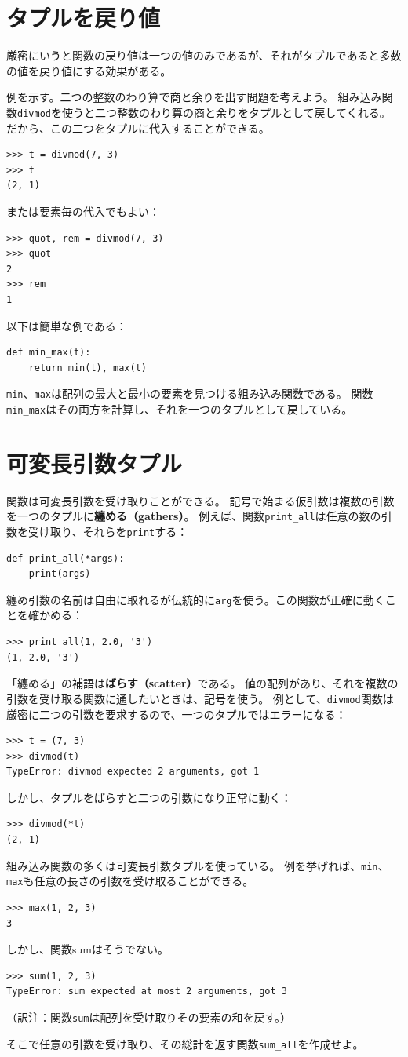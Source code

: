 \documentclass[a4j,12pt,makeidx]{jbook}
\begin{document}
\section{タプルを戻り値}
厳密にいうと関数の戻り値は一つの値のみであるが、それがタプルであると多数の値を戻り値にする効果がある。\par
例を示す。二つの整数のわり算で商と余りを出す問題を考えよう。
組み込み関数{\tt divmod}を使うと二つ整数のわり算の商と余りをタプルとして戻してくれる。　
だから、この二つをタプルに代入することができる。
\begin{verbatim}
>>> t = divmod(7, 3)
>>> t
(2, 1)
\end{verbatim}
または要素毎の代入でもよい：
\begin{verbatim}
>>> quot, rem = divmod(7, 3)
>>> quot
2
>>> rem
1
\end{verbatim} \par
以下は簡単な例である：
\begin{verbatim}
def min_max(t):
    return min(t), max(t)
\end{verbatim}
{\tt min}、{\tt max}は配列の最大と最小の要素を見つける組み込み関数である。
関数{\tt min\_max}はその両方を計算し、それを一つのタプルとして戻している。
%
\section{可変長引数タプル}
関数は可変長引数を受け取りことができる。
記号{\tt *}で始まる仮引数は複数の引数を一つのタプルに{\bf 纏める（gathers）}。
例えば、関数{\tt print\_all}は任意の数の引数を受け取り、それらを{\tt print}する：
\begin{verbatim}
def print_all(*args):
    print(args)
\end{verbatim}
纏め引数の名前は自由に取れるが伝統的に{\tt arg}を使う。この関数が正確に動くことを確かめる：
\begin{verbatim}
>>> print_all(1, 2.0, '3')
(1, 2.0, '3')
\end{verbatim} \par
「纏める」の補語は{\bf ばらす（scatter）}である。
値の配列があり、それを複数の引数を受け取る関数に通したいときは、記号{\tt *}を使う。
例として、{\tt divmod}関数は厳密に二つの引数を要求するので、一つのタプルではエラーになる：
\begin{verbatim}
>>> t = (7, 3)
>>> divmod(t)
TypeError: divmod expected 2 arguments, got 1
\end{verbatim}
しかし、タプルをばらすと二つの引数になり正常に動く：
\begin{verbatim}
>>> divmod(*t)
(2, 1)
\end{verbatim} \par
組み込み関数の多くは可変長引数タプルを使っている。
例を挙げれば、{\tt min}、{\tt max}も任意の長さの引数を受け取ることができる。
\begin{verbatim}
>>> max(1, 2, 3)
3
\end{verbatim}
しかし、関数sumはそうでない。
\begin{verbatim}
>>> sum(1, 2, 3)
TypeError: sum expected at most 2 arguments, got 3
\end{verbatim}
（訳注：関数{\tt sum}は配列を受け取りその要素の和を戻す。）\par
そこで任意の引数を受け取り、その総計を返す関数{\tt sum\_all}を作成せよ。
%
\end{document}
